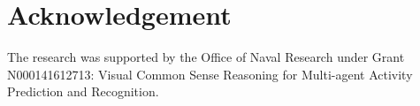 \documentclass[10pt,twocolumn,letterpaper]{article}
\begin{document}


% 
\section*{Acknowledgement}
The research was supported by the Office of Naval Research under Grant N000141612713: Visual Common Sense Reasoning for Multi-agent Activity Prediction and Recognition.

{\small


}
\end{document}

